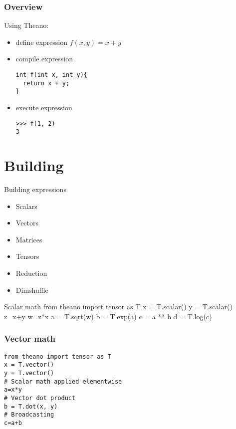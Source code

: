 \documentclass[utf8x,xcolor=pdftex,dvipsnames,table]{beamer}
\begin{document}
\begin{frame}[fragile]
  \frametitle{Overview}
  Using Theano:
  \begin{itemize}
  \item define expression $f(x,y) = x + y$
  \item compile expression
\begin{lstlisting}
int f(int x, int y){
  return x + y;
}
\end{lstlisting}

  \item execute expression
\begin{lstlisting}
>>> f(1, 2)
3
\end{lstlisting}
  \end{itemize}
\end{frame}


\section{Building}
\begin{frame}{Building expressions}
  \begin{itemize}
  \item Scalars
  \item Vectors
  \item Matrices
  \item Tensors
  \item Reduction
  \item Dimshuffle
  \end{itemize}
\end{frame}

\begin{frame}{Scalar math}
from theano import tensor as T
x = T.scalar()
y = T.scalar()
z=x+y
w=z*x
a = T.sqrt(w)
b = T.exp(a)
c = a ** b
d = T.log(c)
\end{frame}

\begin{frame}[fragile]
  \frametitle{Vector math}

\begin{lstlisting}
from theano import tensor as T
x = T.vector()
y = T.vector()
# Scalar math applied elementwise
a=x*y
# Vector dot product
b = T.dot(x, y)
# Broadcasting
c=a+b
\end{lstlisting}
\end{frame}
\end{document}
